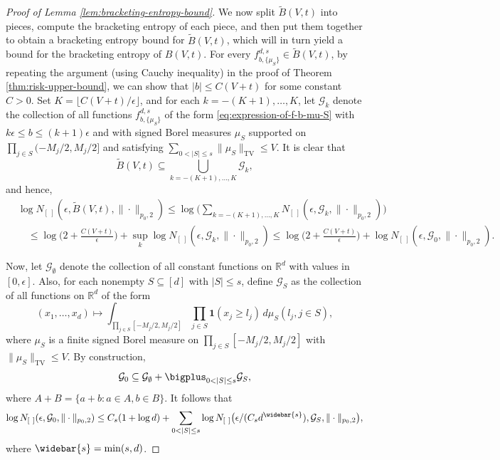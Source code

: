 \documentclass[10pt]{article}
\newcommand{\G}{{\mathcal{G}}}
\newcommand{\R}{{\mathbb R}}
\newcommand{\ind}{{\mathbf{1}}}
\newcommand{\floor}[1]{\lfloor #1 \rfloor}
\begin{document}
\begin{proof}[Proof of Lemma \ref{lem:bracketing-entropy-bound}]
We now split $\widetilde{B}(V, t)$ into pieces, compute the bracketing entropy 
of each piece, and then put them 
together to obtain a bracketing entropy bound for $\widetilde{B}(V, t)$, 
which will in turn yield a bound for the bracketing entropy of $B(V, t)$.
For every $f^{d, s}_{b, \{\mu_S\}} \in \widetilde{B}(V, t)$, by repeating the argument 
(using Cauchy inequality) in the proof of Theorem \ref{thm:risk-upper-bound}, 
we can show that $|b| \le C(V + t)$ for some constant $C > 0$.
Set $K = \floor{C(V + t)/\epsilon}$, and for each $k = -(K + 1), \dots, K$, 
let $\G_k$ denote the collection of all functions 
$f^{d, s}_{b, \{\mu_S\}}$ of the form \eqref{eq:expression-of-f-b-mu-S}
with $k \epsilon \le b \le (k + 1) \epsilon$ and with signed Borel measures 
$\mu_S$ supported on $\prod_{j \in S} (-M_j/2, M_j/2]$ and satisfying 
$\sum_{0 < |S| \le s} \|\mu_S\|_{\text{TV}} \le V$. 
It is clear that 
\begin{equation*}
    \widetilde{B}(V, t) \subseteq \bigcup_{k = -(K + 1), \dots, K} \G_k,
\end{equation*}
and hence,
\begin{align}\label{eq:constant-split}
    &\log N_{[ \ ]}(\epsilon, \widetilde{B}(V, t), \| \cdot \|_{p_0, 2}) 
    \le \log \Big( \sum_{k = -(K + 1), \dots, K} 
    N_{[ \ ]}(\epsilon, \G_k, \| \cdot \|_{p_0, 2}) \Big) \\
    &\quad \le \log\Big(2 + \frac{C(V + t)}{\epsilon}\Big) 
    + \sup_k \log N_{[ \ ]}(\epsilon, \G_k, \| \cdot \|_{p_0, 2})
    \le \log\Big(2 + \frac{C(V + t)}{\epsilon}\Big) 
    + \log N_{[ \ ]}(\epsilon, \G_0, \| \cdot \|_{p_0, 2}) \nonumber.
\end{align}
    
Now, let $\G_{\emptyset}$ denote the collection of all constant functions 
on $\R^d$ with values in $[0, \epsilon]$.
Also, for each nonempty $S \subseteq [d]$ with $|S| \le s$, define 
$\G_{S}$ as the collection of all functions on $\R^d$ of the form
\begin{equation*}
    (x_1, \dots, x_d) \mapsto 
    \int_{\prod_{j \in S} [-M_j/2, M_j/2]} \prod_{j \in S} \ind(x_j \ge l_j) 
    \, d\mu_S(l_j, j \in S),
\end{equation*}
where $\mu_S$ is a finite signed Borel measure 
on $\prod_{j \in S} [-M_j/2, M_j/2]$ with $\|\mu_S\|_{\text{TV}} \le V$. 
By construction, 
\begin{equation*}
    \G_0 \subseteq \G_{\emptyset} 
    + \bigplus_{0 < |S| \le s} \G_{S},
\end{equation*}
where $A + B = \{a + b: a \in A, b \in B\}$.
It follows that
\begin{equation}\label{eq:integral-split}
    \log N_{[ \ ]}(\epsilon, \G_0, \| \cdot \|_{p_0, 2}) 
    \le C_s(1 + \log d) + 
    \sum_{0 < |S| \le s} 
    \log N_{[ \ ]}\big(\epsilon/(C_s d^{\widebar{s}}), 
    \G_{S}, \| \cdot \|_{p_0, 2}\big),
\end{equation}
where $\widebar{s} = \min(s, d)$.


\end{proof}
\end{document}
